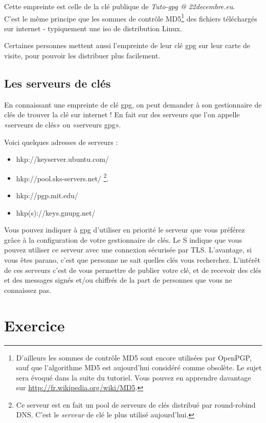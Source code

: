 Cette empreinte est celle de la clé publique de \emph{Tuto-gpg @
22decembre.eu}.\\C'est le même principe que les sommes de contrôle MD5\footnote{D'ailleurs les sommes de contrôle MD5 sont encore utilisées par OpenPGP, sauf que l'algorithme MD5 est aujourd'hui considéré comme obsolète. Le sujet sera évoqué dans la suite du tutoriel. Vous pouvez en apprendre davantage sur \url{http://fr.wikipedia.org/wiki/MD5}.} des
fichiers téléchargés sur internet - typiquement une iso de distribution Linux.

Certaines personnes mettent aussi l'empreinte de leur clé gpg sur leur
carte de visite, pour pouvoir les distribuer plus facilement.

\subsection{Les serveurs de clés}\label{les-serveurs-de-cluxe9s}

En connaissant une empreinte de clé gpg, on peut demander à son
gestionnaire de clés de trouver la clé sur internet ! En fait sur des
serveurs que l'on appelle «serveurs de clés» ou «serveurs gpg».

Voici quelques adresses de serveurs :

\begin{itemize}
\itemsep1pt\parskip0pt
\item
  hkp://keyserver.ubuntu.com/
\item
  hkp://pool.sks-servers.net/ \footnote{Ce serveur est en fait un pool de serveurs de clés distribué par round-robind DNS. C'est le \textit{serveur} de clé le plus utilisé aujourd'hui.}.
\item
  hkp://pgp.mit.edu/
\item
  hkp(s)://keys.gnupg.net/
\end{itemize}

Vous pouvez indiquer à gpg d'utiliser en priorité le serveur que vous
préférez grâce à la configuration de votre gestionnaire de clés. Le S indique que vous pouvez utiliser ce serveur avec une connexion
sécurisée par TLS. L'avantage, si vous êtes parano, c'est que personne
ne sait quelles clés vous recherchez. L'intérêt de ces serveurs c'est de vous permettre de publier votre clé,
et de recevoir des clés et des messages signés et/ou chiffrés de la part
de personnes que vous ne connaissez pas.

\section{Exercice}\label{exercice}

